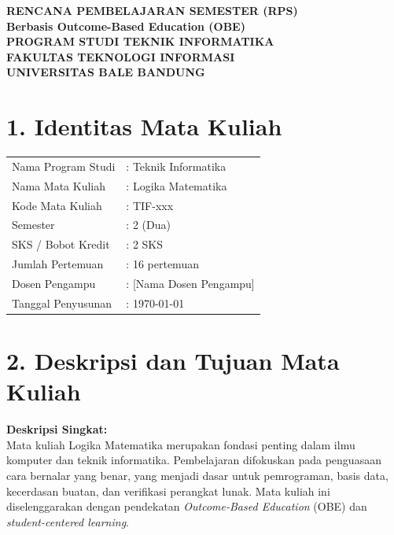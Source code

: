 \documentclass[12pt,a4paper]{article}
\begin{document}
\begin{center}
\textbf{\Large RENCANA PEMBELAJARAN SEMESTER (RPS)}\\
\textbf{Berbasis Outcome-Based Education (OBE)}\\[0.5cm]
\textbf{PROGRAM STUDI TEKNIK INFORMATIKA}\\
\textbf{FAKULTAS TEKNOLOGI INFORMASI}\\
\textbf{UNIVERSITAS BALE BANDUNG}\\
\end{center}

\vspace{1cm}

\section*{1. Identitas Mata Kuliah}
\begin{tabular}{ll}
Nama Program Studi & : Teknik Informatika \\
Nama Mata Kuliah & : Logika Matematika \\
Kode Mata Kuliah & : TIF-xxx \\
Semester & : 2 (Dua) \\
SKS / Bobot Kredit & : 2 SKS \\
Jumlah Pertemuan & : 16 pertemuan \\
Dosen Pengampu & : [Nama Dosen Pengampu] \\
Tanggal Penyusunan & : \today \\
\end{tabular}

\vspace{0.5cm}

\section*{2. Deskripsi dan Tujuan Mata Kuliah}

\textbf{Deskripsi Singkat:}\\
Mata kuliah Logika Matematika merupakan fondasi penting dalam ilmu komputer dan teknik informatika. Pembelajaran difokuskan pada penguasaan cara bernalar yang benar, yang menjadi dasar untuk pemrograman, basis data, kecerdasan buatan, dan verifikasi perangkat lunak. Mata kuliah ini diselenggarakan dengan pendekatan \textit{Outcome-Based Education} (OBE) dan \textit{student-centered learning}.
\end{document}
